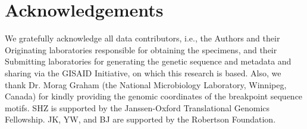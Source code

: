 \documentclass{article}
\begin{document}
\section{Acknowledgements}

We gratefully acknowledge all data contributors, i.e., the Authors and their Originating laboratories responsible for obtaining the specimens, and their Submitting laboratories for generating the genetic sequence and metadata and sharing via the GISAID Initiative, on which this research is based. Also, we thank Dr. Morag Graham (the National Microbiology Laboratory, Winnipeg, Canada) for kindly providing the genomic coordinates of the breakpoint sequence motifs. SHZ is supported by the Janssen-Oxford Translational Genomics Fellowship. JK, YW, and BJ are supported by the Robertson Foundation.
\end{document}
